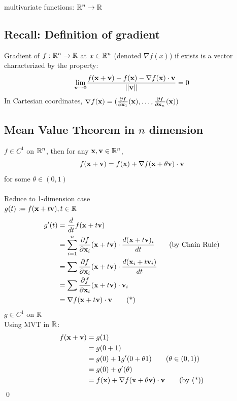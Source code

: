 \documentclass[11pt]{article}
\begin{document}
multivariate functions: $\mathbb{R}^n \rightarrow \mathbb{R}$
\subsection{Recall: Definition of gradient}
Gradient of $f: \mathbb{R}^n \rightarrow \mathbb{R}$ at $x \in \mathbb{R}^n$ (denoted $\nabla f(x)$) if exists is a vector characterized by the property:
$$\underset{\textbf{v} \rightarrow \textbf{0}}{\lim} \frac{f(\textbf{x}+\textbf{v})-f(\textbf{x}) - \nabla f(\textbf{x}) \cdot \textbf{v}}{||\textbf{v}||} = 0$$
In Cartesian coordinates, $\nabla f(\textbf{x}) = (\frac{\partial f}{\partial \textbf{x}_1}(\textbf{x}), \hdots, \frac{\partial f}{\partial \textbf{x}_n}(\textbf{x}))$

\subsection{Mean Value Theorem in $n$ dimension}
$f \in C^1$ on $\mathbb{R}^n$, then for any $\textbf{x}, \textbf{v} \in \mathbb{R}^n$,
$$f(\textbf{x} + \textbf{v}) = f(\textbf{x}) + \nabla f(\textbf{x}+ \theta \textbf{v}) \cdot \textbf{v}$$
for some $\theta \in (0,1)$\\\\
 Reduce to 1-dimension case \\
$g(t) := f(\textbf{x}+t\textbf{v}), t \in \mathbb{R}$ \\
\begin{align*}
	g'(t) &= \frac{d}{dt}f(\textbf{x}+t\textbf{v}) \\
	&= \sum_{i=1}^n \frac{\partial f}{\partial \textbf{x}_i}(\textbf{x} + t\textbf{v})\cdot \frac{d(\textbf{x}+t\textbf{v})_i}{dt}
	\tag{by Chain Rule} \\
	&= \sum \frac{\partial f}{\partial \textbf{x}_i}(\textbf{x} + t\textbf{v})\cdot \frac{d(\textbf{x}_i + t\textbf{v}_i)}{dt} \\
	&= \sum \frac{\partial f}{\partial \textbf{x}_i} (\textbf{x} + t\textbf{v})\cdot \textbf{v}_i \\
	&= \nabla f(\textbf{x} + t\textbf{v})\cdot \textbf{v} \tag{*}
\end{align*}
$g \in C^1$ on $\mathbb{R}$\\
Using MVT in $\mathbb{R}$:
\begin{align*}
f(\textbf{x}+\textbf{v}) &= g(1) \\
&= g(0+1) \\
&= g(0) + 1g'(0+\theta 1) \tag{$\theta \in (0,1)$}\\
&= g(0) + g'(\theta) \\
&= f(\textbf{x}) + \nabla f(\textbf{x}+\theta \textbf{v}) \cdot \textbf{v} \tag{by (*)}
\end{align*}
\qed
\end{document}
